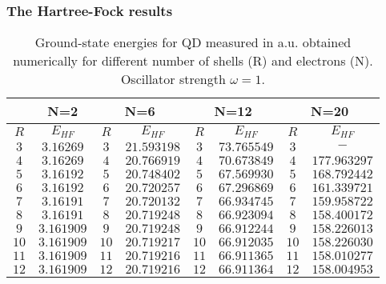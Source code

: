 \documentclass[twoside,english]{uiofysmaster}
\theoremstyle{definition}
\begin{document}
\subsubsection{The Hartree-Fock results}
\begin{table}[h!]
	\begin{center}
		\begin{tabular}{|c c| c c| c c| c c|}
			\hline
			\multirow{2}{*}{} & 
			\multicolumn{1}{c}{N=2} \vline& 
			\multicolumn{2}{c}{N=6} \vline&
			\multicolumn{2}{c}{N=12} \vline&
			\multicolumn{2}{c}{N=20} \vline\\
			\hline
			$R$  & $E_{HF}$ & $R$ & $E_{HF}$ & $R$  & $E_{HF}$ &$R$ &  $E_{HF}$  \\
			\hline
			$  3 $   & $3.16269$  &$ 3 $  & $21.593198$  &$  3 $   & $73.765549$   &$ 3$  & $-          $   \\
			$  4 $   & $3.16269$  &$ 4 $  & $20.766919$  &$  4 $   & $70.673849$   &$ 4$  & $177.963297 $   \\
			$  5 $   & $3.16192$  &$ 5 $  & $20.748402$  &$  5 $   & $67.569930$   &$ 5$  & $168.792442 $   \\
			$  6 $   & $3.16192$  &$ 6 $  & $20.720257$  &$  6 $   & $67.296869$   &$ 6$  & $161.339721 $   \\
			$  7 $   & $3.16191$  &$ 7 $  & $20.720132$  &$  7 $   & $66.934745$   &$ 7$  & $159.958722 $   \\
			$  8 $   & $3.16191$  &$ 8 $  & $20.719248$  &$  8 $   & $66.923094$   &$ 8$  & $158.400172 $   \\
			$  9 $   & $3.161909$ &$ 9 $  & $20.719248$  &$  9 $   & $66.912244$   &$ 9$  & $158.226013 $   \\
			$  10$   & $3.161909$ &$ 10$  & $20.719217$  &$  10$   & $66.912035$   &$ 10$ & $158.226030 $   \\
			$  11$   & $3.161909$ &$ 11$  & $20.719216$  &$  11$   & $66.911365$   &$ 11$ & $158.010277 $   \\
			$  12$   & $3.161909$ &$ 12$  & $20.719216$  &$  12$   & $66.911364$   &$ 12$ & $158.004953 $   \\
			\hline                                                                                    
		\end{tabular}
		\caption{ Ground-state energies for QD measured in a.u. obtained numerically for different number of shells (R) and electrons (N).  Oscillator strength $\omega=1$.}   \label{tab:resultsHF}
	\end{center}
\end{table}
\end{document}
